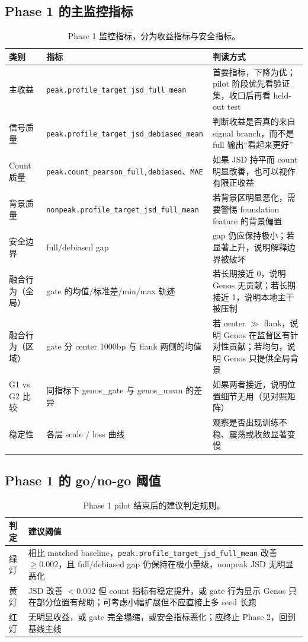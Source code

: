 \documentclass[11pt,a4paper]{ctexart}
\begin{document}
\subsection{Phase 1 的主监控指标}

\begin{table}[H]
\centering
\small
\caption{Phase 1 监控指标，分为收益指标与安全指标。}
\label{tab:phase1_metrics}
\begin{tabularx}{\textwidth}{l l Y}
\toprule
类别 & 指标 & 判读方式 \\
\midrule
主收益 & \texttt{peak.profile\_target\_jsd\_full\_mean} & 首要指标，下降为优；pilot 阶段优先看验证集，收口后再看 held-out test \\
信号质量 & \texttt{peak.profile\_target\_jsd\_debiased\_mean} & 判断收益是否真的来自 signal branch，而不是 full 输出“看起来更好” \\
Count 质量 & \texttt{peak.count\_pearson\_{full,debiased}}、\texttt{MAE} & 如果 JSD 持平而 count 明显改善，也可以视作有限正收益 \\
背景质量 & \texttt{nonpeak.profile\_target\_jsd\_full\_mean} & 若背景区明显恶化，需要警惕 foundation feature 的背景偏置 \\
安全边界 & full/debiased gap & gap 仍应保持极小；若显著上升，说明解释边界被破坏 \\
融合行为（全局） & gate 的均值/标准差/min/max 轨迹 & 若长期接近 0，说明 Genos 无贡献；若长期接近 1，说明本地主干被压制 \\
融合行为（区域） & gate 分 center 1000bp 与 flank 两侧的均值 & 若 center $\gg$ flank，说明 Genos 在监督区有针对性贡献；若均匀，说明 Genos 只提供全局背景 \\
G1 vs G2 比较 & 同指标下 genos\_gate 与 genos\_mean 的差异 & 如果两者接近，说明位置细节无用（见对照矩阵） \\
稳定性 & 各层 scale / loss 曲线 & 观察是否出现训练不稳、震荡或收敛显著变慢 \\
\bottomrule
\end{tabularx}
\end{table}

\subsection{Phase 1 的 go/no-go 阈值}

\begin{table}[H]
\centering
\small
\caption{Phase 1 pilot 结束后的建议判定规则。}
\label{tab:phase1_thresholds}
\begin{tabularx}{\textwidth}{l Y}
\toprule
判定 & 建议阈值 \\
\midrule
绿灯 & 相比 matched baseline，\texttt{peak.profile\_target\_jsd\_full\_mean} 改善 $\ge 0.002$，且 full/debiased gap 仍保持在极小量级，nonpeak JSD 无明显恶化 \\
黄灯 & JSD 改善 $< 0.002$ 但 count 指标有稳定提升，或 gate 行为显示 Genos 只在部分位置有帮助；可考虑小幅扩展但不应直接上多 seed 长跑 \\
红灯 & 无明显收益，或 gate 完全塌缩，或安全指标恶化；应终止 Phase 2，回到基线主线 \\
\bottomrule
\end{tabularx}
\end{table}
\end{document}
